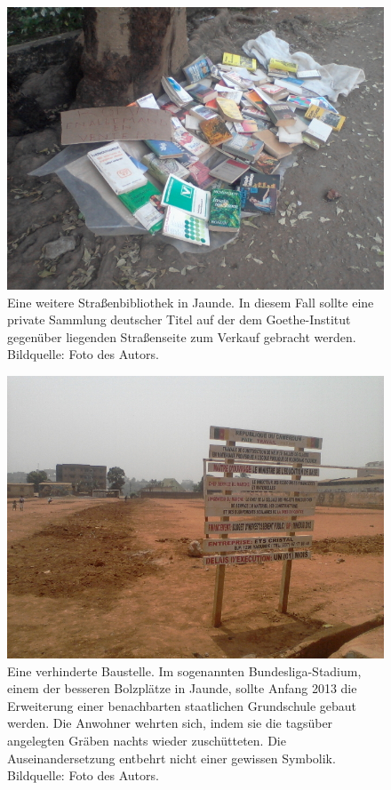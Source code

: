 \documentclass[a4paper,
fontsize=11pt,
oneside,
numbers=noperiodatend,
parskip=half-,
bibliography=totoc,
final
]{scrartcl}
\begin{document}
\begin{figure}[htbp]
\centering
\includegraphics{img/LibrairiePoteau2.jpg}
\caption{Eine weitere Straßenbibliothek in Jaunde. In
diesem Fall sollte eine private Sammlung deutscher Titel auf der dem
Goethe-Institut gegenüber liegenden Straßenseite zum Verkauf gebracht
werden. Bildquelle: Foto des Autors.}
\end{figure}

\begin{figure}[htbp]
\centering
\includegraphics{img/bundesliga.jpg}
\caption{Eine verhinderte Baustelle. Im sogenannten Bundesliga-Stadium,
einem der besseren Bolzplätze in Jaunde, sollte Anfang 2013 die
Erweiterung einer benachbarten staatlichen Grundschule gebaut werden.
Die Anwohner wehrten sich, indem sie die tagsüber angelegten Gräben
nachts wieder zuschütteten. Die Auseinandersetzung entbehrt nicht einer
gewissen Symbolik. Bildquelle: Foto des Autors.}
\end{figure}
\end{document}
